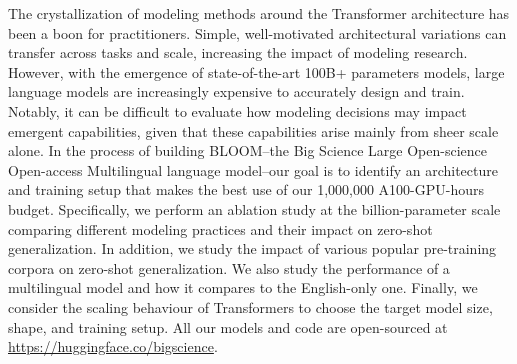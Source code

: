 The crystallization of modeling methods around the Transformer architecture has been a boon for practitioners. 
Simple, well-motivated architectural variations can transfer across tasks and scale, increasing the impact of modeling research. 
However, with the emergence of state-of-the-art 100B+ parameters models, large language models are increasingly expensive to accurately design and train. 
Notably, it can be difficult to evaluate how modeling decisions may impact emergent capabilities, given that these capabilities arise mainly from sheer scale alone.
In the process of building BLOOM--the Big Science Large Open-science Open-access Multilingual language model--our goal is to identify an architecture and training setup that makes the best use of our 1,000,000 A100-GPU-hours budget.
Specifically, we perform an ablation study at the billion-parameter scale comparing different modeling practices and their impact on zero-shot generalization.
In addition, we study the impact of various popular pre-training corpora on zero-shot generalization. 
We also study the performance of a multilingual model and how it compares to the English-only one. 
Finally, we consider the scaling behaviour of Transformers to choose the target model size, shape, and training setup. All our models and code are open-sourced at \url{https://huggingface.co/bigscience}.